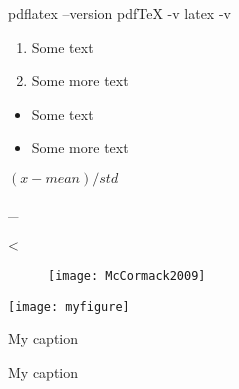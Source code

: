 
pdflatex --version
pdfTeX -v
latex -v


\setlength{\parskip}{1em} %

\usepackage{enumitem}

\begin{enumerate}
  \item Some text
   \item Some more text
\end{enumerate}

\begin{itemize}
   \item Some text
   \item Some more text
\end{itemize}

\( (x - mean)/std \) 

_

\textless %

\graphicspath{ {images/} }
\begin{figure}
  \texttt{[image: McCormack2009]} %
\end{figure}

\texttt{[image: myfigure]} %

\caption{My caption} %
\caption*{My caption} %

